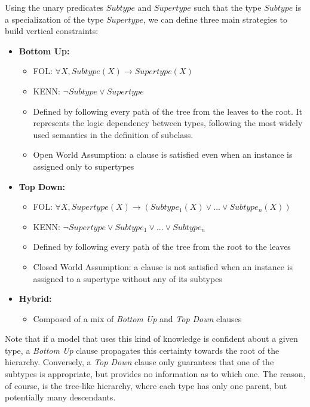 Using the unary predicates $Subtype$ and $Supertype$ such that the type $Subtype$ is a specialization of the type $Supertype$, we can define three main strategies to build vertical constraints:
\begin{itemize}
    \item \textbf{Bottom Up:}
        \begin{itemize}
            \item FOL: $ \forall X, Subtype(X) \to Supertype(X) $
            \item KENN: $ \neg Subtype \vee Supertype $
            \item Defined by following every path of the tree from the leaves to the root. It represents the logic dependency between types, following the most widely used semantics in the definition of subclass.
            \item Open World Assumption: a clause is satisfied even when an instance is assigned only to supertypes
        \end{itemize}
    \item \textbf{Top Down:}
        \begin{itemize}
            \item FOL: $ \forall X, Supertype(X) \to (Subtype_{1}(X) \vee ... \vee Subtype_{n}(X)) $
            \item KENN: $ \neg Supertype \vee Subtype_{1} \vee ... \vee Subtype_{n}  $
            \item Defined by following every path of the tree from the root to the leaves
            \item Closed World Assumption: a clause is not satisfied when an instance is assigned to a supertype without any of its subtypes
        \end{itemize}  
    \item \textbf{Hybrid:} 
    \begin{itemize}
        \item Composed of a mix of \textit{Bottom Up} and \textit{Top Down} clauses
    \end{itemize}
\end{itemize}
Note that if a model that uses this kind of knowledge is confident about a given type, a \textit{Bottom Up} clause propagates this certainty towards the root of the hierarchy. Conversely, a \textit{Top Down} clause only guarantees that one of the subtypes is appropriate, but provides no information as to which one. The reason, of course, is the tree-like hierarchy, where each type has only one parent, but potentially many descendants.

